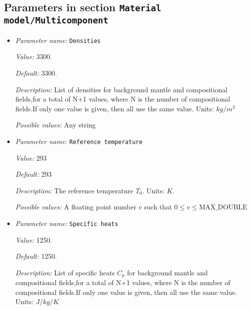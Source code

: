 \subsection{Parameters in section \tt Material model/Multicomponent}
\label{parameters:Material_20model/Multicomponent}

\begin{itemize}
\item {\it Parameter name:} {\tt Densities}
\label{parameters:Material model/Multicomponent/Densities}
\label{parameters:Material_20model/Multicomponent/Densities}


{\it Value:} 3300.


{\it Default:} 3300.


{\it Description:} List of densities for background mantle and compositional fields,for a total of N+1 values, where N is the number of compositional fields.If only one value is given, then all use the same value.  Units: $kg / m^3$


{\it Possible values:} Any string
\item {\it Parameter name:} {\tt Reference temperature}
\label{parameters:Material model/Multicomponent/Reference temperature}
\label{parameters:Material_20model/Multicomponent/Reference_20temperature}


{\it Value:} 293


{\it Default:} 293


{\it Description:} The reference temperature $T_0$. Units: $K$.


{\it Possible values:} A floating point number $v$ such that $0 \leq v \leq \text{MAX\_DOUBLE}$
\item {\it Parameter name:} {\tt Specific heats}
\label{parameters:Material model/Multicomponent/Specific heats}
\label{parameters:Material_20model/Multicomponent/Specific_20heats}


{\it Value:} 1250.


{\it Default:} 1250.


{\it Description:} List of specific heats $C_p$ for background mantle and compositional fields,for a total of N+1 values, where N is the number of compositional fields.If only one value is given, then all use the same value. Units: $J /kg /K$



\end{itemize}
